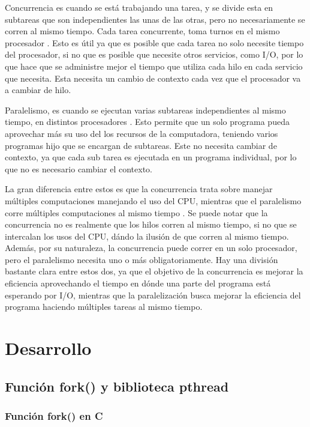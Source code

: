 \documentclass{report}
\begin{document}
Concurrencia es cuando se está trabajando una tarea, y se divide esta en subtareas que son independientes las unas de las otras, pero no necesariamente se corren al mismo tiempo.
Cada tarea concurrente, toma turnos en el mismo procesador \cite{ref1}.
Esto es útil ya que es posible que cada tarea no solo necesite tiempo del procesador, si no que es posible que necesite otros servicios, como I/O, por lo que hace que se administre mejor el tiempo que utiliza cada hilo en cada servicio que necesita. 
Esta necesita un cambio de contexto cada vez que el procesador va a cambiar de hilo. 

Paralelismo, es cuando se ejecutan varias subtareas independientes al mismo tiempo, en distintos procesadores \cite{ref1}. 
Esto permite que un solo programa pueda aprovechar más su uso del los recursos de la computadora, teniendo varios programas hijo que se encargan de subtareas.
Este no necesita cambiar de contexto, ya que cada sub tarea es ejecutada en un programa individual, por lo que no es necesario cambiar el contexto. 

La gran diferencia entre estos es que la concurrencia trata sobre manejar múltiples computaciones manejando el uso del CPU, mientras que el paralelismo corre múltiples computaciones al mismo tiempo \cite{ref1}.
Se puede notar que la concurrencia no es realmente que los hilos corren al mismo tiempo, si no que se intercalan los usos del CPU, dándo la ilusión de que corren al mismo tiempo. Además, por su naturaleza, la concurrencia puede correr en un solo procesador, pero el paralelismo necesita uno o más obligatoriamente.
Hay una división bastante clara entre estos dos, ya que el objetivo de la concurrencia es mejorar la eficiencia aprovechando el tiempo en dónde una parte del programa está esperando por I/O, mientras que la paralelización busca mejorar la eficiencia del programa haciendo múltiples tareas al mismo tiempo. 



\chapter {Desarrollo}

\section {Función fork() y biblioteca pthread}

\subsection {Función fork() en C}
\end{document}
